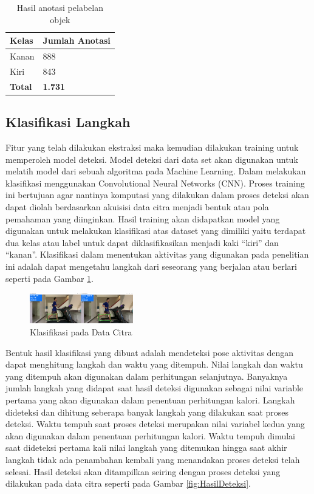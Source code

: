 \begin{table} [ht]
  \caption{Hasil anotasi pelabelan objek}
  \label{tab:HasilAnotasi}
  \centering
  \begin{tabular}{ll}
    \toprule
    Kelas & Jumlah Anotasi  \\
    \midrule
    Kanan       & 888    \\
    Kiri        & 843    \\
    \textbf{Total}       & \textbf{1.731}        \\
    \bottomrule
  \end{tabular}
\end{table}

\subsection{Klasifikasi Langkah}
\label{subsec:KlasifikasiLangkah}

Fitur yang telah dilakukan ekstraksi maka kemudian dilakukan training untuk memperoleh model deteksi. Model deteksi dari data set akan digunakan untuk melatih model dari sebuah algoritma pada Machine Learning. Dalam melakukan klasifikasi menggunakan Convolutional Neural Networks (CNN). Proses training ini bertujuan agar nantinya komputasi yang dilakukan dalam proses deteksi akan dapat diolah berdasarkan akuisisi data citra menjadi bentuk atau pola pemahaman yang diinginkan. Hasil training akan didapatkan model yang digunakan untuk melakukan klasifikasi atas dataset yang dimiliki yaitu terdapat dua kelas atau label untuk dapat diklasifikasikan menjadi kaki “kiri” dan “kanan”. Klasifikasi dalam menentukan aktivitas yang digunakan pada penelitian ini adalah dapat mengetahu langkah dari seseorang yang berjalan atau berlari seperti pada Gambar \ref{fig:DeteksiModel}.

\begin{figure} [ht]
  \centering
  \includegraphics[width=0.4\textwidth]{gambar/deteksi.png}
  \caption{Klasifikasi pada Data Citra}
  \label{fig:DeteksiModel}
\end{figure}



Bentuk hasil klasifikasi yang dibuat adalah mendeteksi pose aktivitas dengan dapat menghitung langkah dan waktu yang ditempuh. Nilai langkah dan waktu yang ditempuh akan digunakan dalam perhitungan selanjutnya. Banyaknya jumlah langkah yang didapat saat hasil deteksi digunakan sebagai nilai variable pertama yang akan digunakan dalam penentuan perhitungan kalori. Langkah dideteksi dan dihitung seberapa banyak langkah yang dilakukan saat proses deteksi. Waktu tempuh saat proses deteksi merupakan nilai variabel kedua yang akan digunakan dalam penentuan perhitungan kalori. Waktu tempuh dimulai saat dideteksi pertama kali nilai langkah yang ditemukan hingga saat akhir langkah tidak ada penambahan kembali yang menandakan proses deteksi telah selesai. Hasil deteksi akan ditampilkan seiring dengan proses deteksi yang dilakukan pada data citra seperti pada Gambar \ref{fig:HasilDeteksi}.


